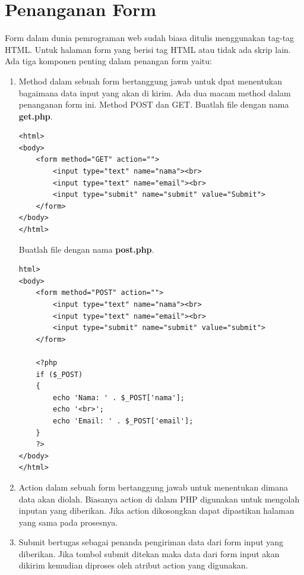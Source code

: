 \section{Penanganan Form}
Form dalam dunia pemrograman web sudah biasa ditulis menggunakan tag-tag HTML. Untuk halaman form yang berisi tag HTML atau tidak ada skrip lain. Ada tiga komponen penting dalam penangan form yaitu:
\begin{enumerate}
\item Method dalam sebuah form bertanggung jawab untuk dpat menentukan bagaimana data input yang akan di kirim. Ada dua macam method dalam penanganan form ini. Method POST dan GET. Buatlah file dengan nama \textbf{get.php}.
\begin{lstlisting}
<html>
<body>
	<form method="GET" action="">
		<input type="text" name="nama"><br>
		<input type="text" name="email"><br>
		<input type="submit" name="submit" value="Submit">
	</form>
</body>
</html>
\end{lstlisting}
Buatlah file dengan nama \textbf{post.php}.
\begin{lstlisting}
html>
<body>
	<form method="POST" action="">
		<input type="text" name="nama"><br>
		<input type="text" name="email"><br>
		<input type="submit" name="submit" value="submit">
	</form>

	<?php
	if ($_POST)
	{
		echo 'Nama: ' . $_POST['nama'];
		echo '<br>';
		echo 'Email: ' . $_POST['email'];
	}
	?>
</body>
</html>
\end{lstlisting}
\item Action dalam sebuah form bertanggung jawab untuk menentukan dimana data akan diolah. Biasanya action di dalam PHP digunakan untuk mengolah inputan yang diberikan. Jika action dikosongkan dapat dipastikan halaman yang sama pada prosesnya.
\item Submit bertugas sebagai penanda pengiriman data dari form input yang diberikan. Jika tombol submit ditekan maka data dari form input akan dikirim kemudian diproses oleh atribut action yang digunakan.
\end{enumerate}

